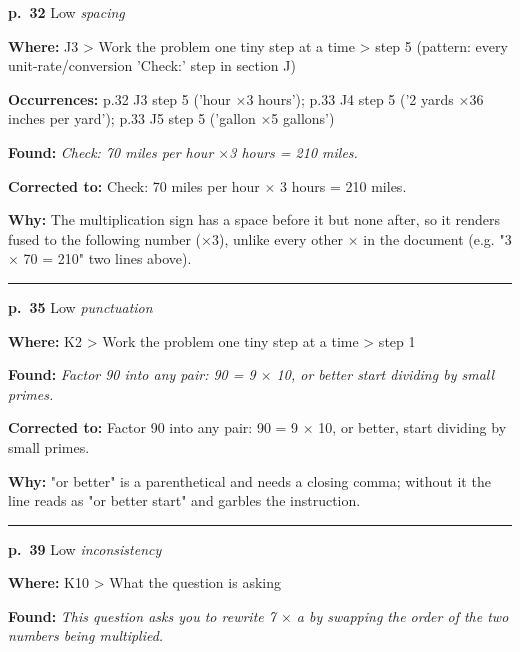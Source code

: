 \documentclass[11pt]{article}
\newcommand{\sevlow}[1]{\textcolor{black!55}{#1}}
\begin{document}
\noindent\textbf{p.~32} \quad \sevlow{Low} \quad \textit{spacing}\par
\noindent\textbf{Where: }J3 > Work the problem one tiny step at a time > step 5 (pattern: every unit-rate/conversion 'Check:' step in section J)\par
\noindent\textbf{Occurrences: }p.32 J3 step 5 ('hour $\times$3 hours'); p.33 J4 step 5 ('2 yards $\times$36 inches per yard'); p.33 J5 step 5 ('gallon $\times$5 gallons')\par
\noindent\textbf{Found: }\textit{Check: 70 miles per hour $\times$3 hours = 210 miles.}\par
\noindent\textbf{Corrected to: }Check: 70 miles per hour $\times$ 3 hours = 210 miles.\par
\noindent\textbf{Why: }The multiplication sign has a space before it but none after, so it renders fused to the following number ($\times$3), unlike every other $\times$ in the document (e.g. "3 $\times$ 70 = 210" two lines above).\par\vspace{4pt}
\noindent\rule{\textwidth}{0.4pt}\par\nobreak\vspace{2pt}
\noindent\textbf{p.~35} \quad \sevlow{Low} \quad \textit{punctuation}\par
\noindent\textbf{Where: }K2 > Work the problem one tiny step at a time > step 1\par
\noindent\textbf{Found: }\textit{Factor 90 into any pair: 90 = 9 $\times$ 10, or better start dividing by small primes.}\par
\noindent\textbf{Corrected to: }Factor 90 into any pair: 90 = 9 $\times$ 10, or better, start dividing by small primes.\par
\noindent\textbf{Why: }"or better" is a parenthetical and needs a closing comma; without it the line reads as "or better start" and garbles the instruction.\par\vspace{4pt}
\noindent\rule{\textwidth}{0.4pt}\par\nobreak\vspace{2pt}
\noindent\textbf{p.~39} \quad \sevlow{Low} \quad \textit{inconsistency}\par
\noindent\textbf{Where: }K10 > What the question is asking\par
\noindent\textbf{Found: }\textit{This question asks you to rewrite 7 $\times$ a by swapping the order of the two numbers being multiplied.}\par
\end{document}
